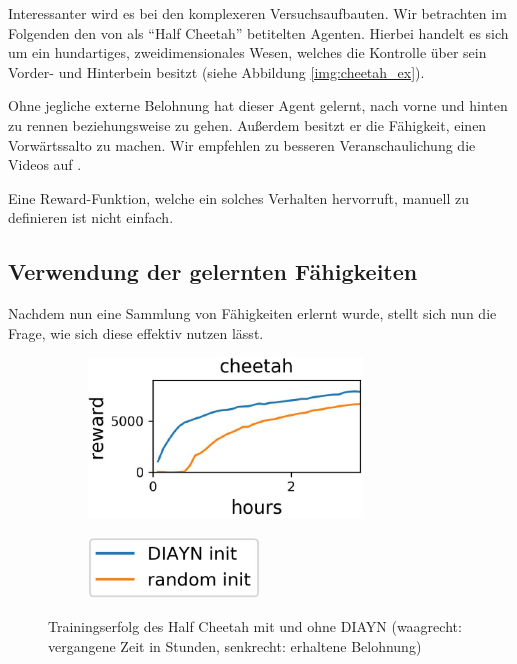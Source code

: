 Interessanter wird es bei den komplexeren Versuchsaufbauten. Wir betrachten im Folgenden den von \cite{diversity_eysenbach} als ``Half Cheetah'' betitelten Agenten. Hierbei handelt es sich um ein hundartiges, zweidimensionales Wesen, welches die Kontrolle über sein Vorder- und Hinterbein besitzt (siehe Abbildung \ref{img:cheetah_ex}).

Ohne jegliche externe Belohnung hat dieser Agent gelernt, nach vorne und hinten zu rennen beziehungsweise zu gehen. Außerdem besitzt er die Fähigkeit, einen Vorwärtssalto zu machen. Wir empfehlen zu besseren Veranschaulichung die Videos auf \cite{diversity_web}.

Eine Reward-Funktion, welche ein solches Verhalten hervorruft, manuell zu definieren ist nicht einfach.

\subsection{Verwendung der gelernten Fähigkeiten}
\label{sec:diversityusage}
Nachdem nun eine Sammlung von Fähigkeiten erlernt wurde, stellt sich nun die Frage, wie sich diese effektiv nutzen lässt.

\smallspace

\begin{figure}[h]
\begin{subfigure}{0.6\textwidth}
\includegraphics[width=0.8\textwidth, keepaspectratio=true, right]{images/cheetah_rewards.JPG}
\end{subfigure}
\begin{subfigure}{0.4\textwidth}
\includegraphics[width=0.5\textwidth, keepaspectratio=true, left]{images/cheetah_rewards_exp.JPG}
\end{subfigure}
\caption{Trainingserfolg des Half Cheetah mit und ohne DIAYN (waagrecht: vergangene Zeit in Stunden, senkrecht: erhaltene Belohnung)} \label{img:cheetah_rewards}
\end{figure}

